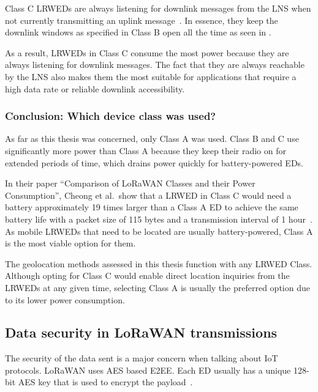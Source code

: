 Class C \aclp{LRWED} are always listening for downlink messages from the \ac{LNS} when not currently transmitting an uplink message~\cite[p. 86]{lora_alliance_inc_lorawan_specification_2017}.
In essence, they keep the downlink windows as specified in Class B open all the time as seen in .

As a result, \aclp{LRWED} in Class C consume the most power because they are always listening for downlink messages.
The fact that they are always reachable by the \ac{LNS} also makes them the most suitable for applications that require a high data rate or reliable downlink accessibility.

\subsubsection{Conclusion: Which device class was used?}

As far as this thesis was concerned, only Class A was used.
Class B and C use significantly more power than Class A because they keep their radio on for extended periods of time, which drains power quickly for battery-powered \aclp{ED}.

In their paper ``Comparison of LoRaWAN Classes and their Power Consumption'', Cheong et al.\ show that a \acl{LRWED} in Class C would need a battery approximately 19 times larger than a Class A \ac{ED} to achieve the same battery life with a packet size of 115 bytes and a transmission interval of 1 hour~\cite{cheong_comparison_2017}.
As mobile \aclp{LRWED} that need to be located are usually battery-powered, Class A is the most viable option for them.

The geolocation methods assessed in this thesis function with any \acl{LRWED} Class.
Although opting for Class C would enable direct location inquiries from the \aclp{LRWED} at any given time, selecting Class A is usually the preferred option due to its lower power consumption.

\subsection{Data security in \acs{LoRaWAN} transmissions}

The security of the data sent is a major concern when talking about \ac{IoT} protocols.
\ac{LoRaWAN} uses \ac{AES} based \acf{E2EE}.
Each \acl{ED} usually has a unique 128-bit \ac{AES} key that is used to encrypt the payload~\cite[p. 24]{lora_alliance_inc_lorawan_specification_2017}.

